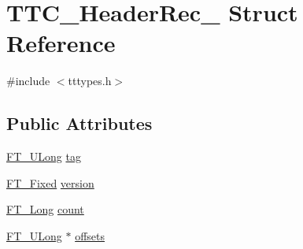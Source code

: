 \hypertarget{struct_t_t_c___header_rec__}{\section{T\-T\-C\-\_\-\-Header\-Rec\-\_\- Struct Reference}
\label{struct_t_t_c___header_rec__}
}


{\ttfamily \#include $<$tttypes.\-h$>$}

\subsection*{Public Attributes}
\begin{DoxyCompactItemize}
\item 
\hyperlink{fttypes_8h_a4fac88bdba78eb76b505efa6e4fbf3f5}{F\-T\-\_\-\-U\-Long} \hyperlink{struct_t_t_c___header_rec___a7fc09906e402f8937b6ca207c84453b4}{tag}
\item 
\hyperlink{fttypes_8h_a5f5a679cc09f758efdd0d1c5feed3c3d}{F\-T\-\_\-\-Fixed} \hyperlink{struct_t_t_c___header_rec___aa9ecb33279c68c3c00c1232441da5801}{version}
\item 
\hyperlink{fttypes_8h_a7fa72a1f0e79fb1860c5965789024d6f}{F\-T\-\_\-\-Long} \hyperlink{struct_t_t_c___header_rec___a0bf5898e9d8c55bc74f51712a5ad1b58}{count}
\item 
\hyperlink{fttypes_8h_a4fac88bdba78eb76b505efa6e4fbf3f5}{F\-T\-\_\-\-U\-Long} $\ast$ \hyperlink{struct_t_t_c___header_rec___a2ab33f787e8085d7086968fb931060b5}{offsets}
\end{DoxyCompactItemize}


